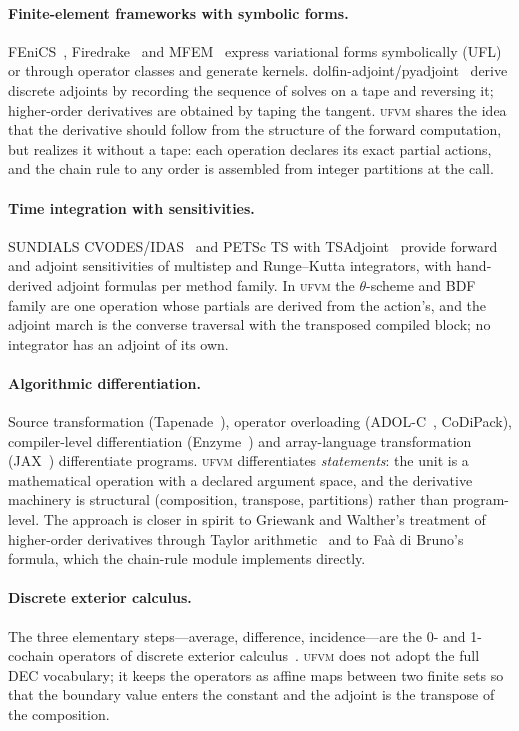 \documentclass[11pt,a4paper]{article}
\newcommand{\ufvm}{\textsc{ufvm}}
\begin{document}
\paragraph{Finite-element frameworks with symbolic forms.} FEniCS~\cite{logg2012}, Firedrake~\cite{rathgeber2016} and MFEM~\cite{anderson2021} express variational forms symbolically (UFL) or through operator classes and generate kernels. dolfin-adjoint/pyadjoint~\cite{farrell2013,mitusch2019} derive discrete adjoints by recording the sequence of solves on a tape and reversing it; higher-order derivatives are obtained by taping the tangent. \ufvm{} shares the idea that the derivative should follow from the structure of the forward computation, but realizes it without a tape: each operation declares its exact partial actions, and the chain rule to any order is assembled from integer partitions at the call.

\paragraph{Time integration with sensitivities.} SUNDIALS CVODES/IDAS~\cite{hindmarsh2005} and PETSc TS with TSAdjoint~\cite{zhang2022} provide forward and adjoint sensitivities of multistep and Runge--Kutta integrators, with hand-derived adjoint formulas per method family. In \ufvm{} the $\theta$-scheme and BDF family are one operation whose partials are derived from the action's, and the adjoint march is the converse traversal with the transposed compiled block; no integrator has an adjoint of its own.

\paragraph{Algorithmic differentiation.} Source transformation (Tapenade~\cite{hascoet2013}), operator overloading (ADOL-C~\cite{griewank1996}, CoDiPack), compiler-level differentiation (Enzyme~\cite{moses2020}) and array-language transformation (JAX~\cite{jax2018}) differentiate programs. \ufvm{} differentiates \emph{statements}: the unit is a mathematical operation with a declared argument space, and the derivative machinery is structural (composition, transpose, partitions) rather than program-level. The approach is closer in spirit to Griewank and Walther's treatment of higher-order derivatives through Taylor arithmetic~\cite{griewank2008} and to Faà di Bruno's formula, which the chain-rule module implements directly.

\paragraph{Discrete exterior calculus.} The three elementary steps---average, difference, incidence---are the 0- and 1-cochain operators of discrete exterior calculus~\cite{desbrun2005,hirani2003,bell2012}. \ufvm{} does not adopt the full DEC vocabulary; it keeps the operators as affine maps between two finite sets so that the boundary value enters the constant and the adjoint is the transpose of the composition.
\end{document}
